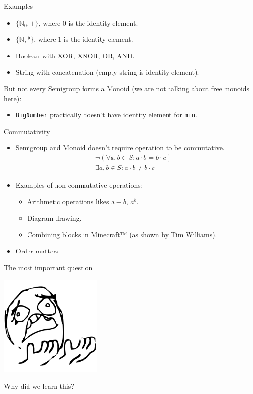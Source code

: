 \documentclass[presentation,aspectratio=169,smaller]{beamer}
\begin{document}
\begin{frame}[label={sec:org24f88de},fragile]{Examples}
 \begin{itemize}
\item \(\{\mathbb{N}_0, +\}\), where \(0\) is the identity element.
\item \(\{\mathbb{N}, *\}\), where \(1\) is the identity element.
\item Boolean with XOR, XNOR, OR, AND.
\item String with concatenation (empty string is identity element).
\end{itemize}

\pause

But not every Semigroup forms a Monoid (we are not talking about free monoids
here):

\begin{itemize}
\item \texttt{BigNumber} practically doesn’t have identity element for \texttt{min}.
\end{itemize}
\end{frame}

\begin{frame}[label={sec:orgedd8e2c}]{Commutativity}
\begin{itemize}
\item <1-> Semigroup and Monoid doesn't require operation to be commutative.
\begin{gather*}
  \neg(\forall a, b \in S : a \cdot b = b \cdot c) \\
  \exists a, b \in S : a \cdot b \ne b \cdot c
\end{gather*}

\item <2-> Examples of non-commutative operations:
\begin{itemize}
\item Arithmetic operations likes \(a - b\), \(a^b\).
\item Diagram drawing.
\item Combining blocks in Minecraft™ (as shown by Tim Williams).
\end{itemize}

\item <3-> Order matters.
\end{itemize}
\end{frame}

\begin{frame}[label={sec:orgf5a8304}]{The most important question}
\pause

\begin{center}
\includegraphics[height=5cm]{images/whyyy.png}
\end{center}

Why did we learn this?
\end{frame}
\end{document}
